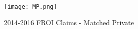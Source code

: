 \documentclass[9pt, oneside]{article}   	%
\begin{document}
\setcounter{table}{0}
\renewcommand{\thetable}{P\arabic{table}}





\begin{figure}[htp]
\caption{2014-2016 FROI Claims - Matched Private}
\hspace{1.5in}

\label{Fig:MP}
\begin{center}
\texttt{[image: MP.png]}
\end{center}
\end{figure}



\pagebreak
\end{document}
